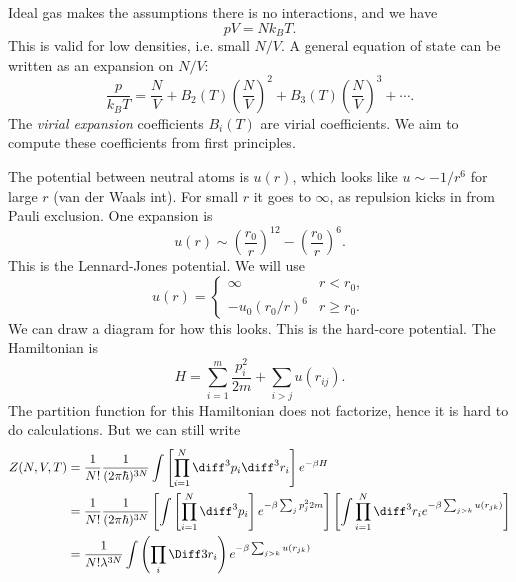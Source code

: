 \documentclass[12pt]{article}
\begin{document}
Ideal gas makes the assumptions there is no interactions, and we have
\[
pV = N k_B T.
\]
This is valid for low densities, i.e. small $N/V$. A general equation of state can be written as an expansion on $N/V$:
\[
\frac{p}{k_B T} = \frac{N}{V} + B_2(T) \left( \frac{N}{V} \right)^2 + B_3(T) \left( \frac{N}{V} \right)^3 + \cdots.
\]
The \emph{virial expansion} coefficients $B_i(T)$ are virial coefficients. We aim to compute these coefficients from first principles.

The potential between neutral atoms is $u(r)$, which looks like $u \sim -1/r^6$ for large $r$ (van der Waals int). For small $r$ it goes to $\infty$, as repulsion kicks in from Pauli exclusion. One expansion is
\[
u(r) \sim \left( \frac{r_0}{r} \right)^{12} - \left( \frac{r_0}{r}\right)^6.
\]
This is the Lennard-Jones potential. We will use
\[
u(r) =
\begin{cases}
	\infty & r < r_0,\\
	-u_0(r_0/r)^6 & r \geq r_0.
\end{cases}
\]
We can draw a diagram for how this looks. This is the hard-core potential. The Hamiltonian is
\[
H = \sum_{i = 1}^m \frac{p_i^2}{2m} + \sum_{i > j} u(r_{ij}).
\]
The partition function for this Hamiltonian does not factorize, hence it is hard to do calculations. But we can still write
\begin{align*}
	Z(N, V, T) &= \frac{1}{N!} \frac{1}{(2 \pi \hbar)^{3N}} \int \left[ \prod_{i = 1}^N \diff^3 p_i \diff^3 r_i \right] e^{-\beta H} \\
		   &= \frac{1}{N!} \frac{1}{(2 \pi \hbar)^{3N}} \left[ \int \left[ \prod_{i = 1}^N \diff^3 p_i \right] e^{-\beta \sum_j p_j^2 2m} \right] \left[ \int \prod_{i = 1}^N \diff^3r_i e^{-\beta \sum_{j > k} u(r_{jk})} \right] \\
		   &= \frac{1}{N! \lambda^{3N}} \int \left( \prod_i \Diff3 r_i \right) e^{-\beta \sum_{j > k} u(r_{jk})}
\end{align*}
\end{document}
